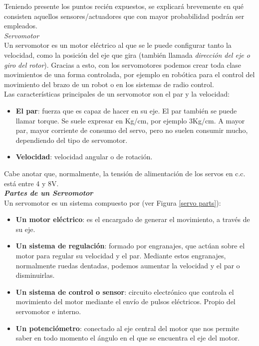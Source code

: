 \documentclass[12pt]{article}
\begin{document}
	\noindent Teniendo presente los puntos recién expuestos, se explicará brevemente en qué consisten aquellos sensores/actuadores que con mayor probabilidad podrán ser empleados. \\
	
	\noindent \textit{Servomotor} \\
	
	\noindent Un servomotor es un motor eléctrico al que se le puede configurar tanto la velocidad, como la posición del eje que gira (también llamada \textit{dirección del eje o giro del rotor}). Gracias a esto, con los servomotores podemos crear toda clase movimientos de una forma controlada, por ejemplo en robótica para el control del movimiento del brazo de un robot o en los sistemas de radio control. \\
	
	\noindent Las características principales de un servomotor son el par y la velocidad:
	
	\begin{itemize}
		\item \textbf{El par}: fuerza que es capaz de hacer en su eje. El par también se puede llamar torque. Se suele expresar en Kg/cm, por ejemplo 3Kg/cm. A mayor par, mayor corriente de consumo del servo, pero no suelen consumir mucho, dependiendo del tipo de servomotor.
		\item \textbf{Velocidad}: velocidad angular o de rotación.
	\end{itemize}

	\noindent Cabe anotar que, normalmente, la tensión de alimentación de los servos en c.c. está entre 4 y 8V.\\ 
	
	\noindent \textit{\textbf{Partes de un Servomotor}}\\
	
	\noindent Un servomotor es un sistema compuesto por (ver Figura \ref{servo parts}): 
	
	\begin{itemize}
		\item \textbf{Un motor eléctrico}: es el encargado de generar el movimiento, a través de su eje.
		\item \textbf{Un sistema de regulación}: formado por engranajes, que actúan sobre el motor para regular su velocidad y el par. Mediante estos engranajes, normalmente ruedas dentadas, podemos aumentar la velocidad y el par o disminuirlas.
		\item \textbf{Un sistema de control o sensor}: circuito electrónico que controla el movimiento del motor mediante el envío de pulsos eléctricos. Propio del servomotor e interno.
		\item \textbf{Un potenciómetro}: conectado al eje central del motor que nos permite saber en todo momento el ángulo en el que se encuentra el eje del motor. %
	\end{itemize}
	
\end{document}
